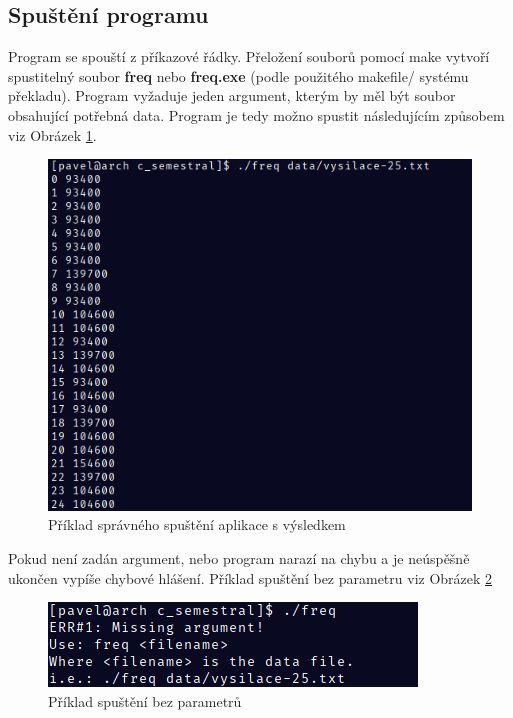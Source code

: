 \documentclass[12pt]{article}
\begin{document}
\subsection{Spuštění programu}
Program se spouští z příkazové řádky. Přeložení souborů pomocí make vytvoří 
spustitelný soubor \textbf{freq} nebo \textbf{freq.exe} (podle použitého
makefile/ systému překladu). Program vyžaduje jeden argument, kterým by měl být
soubor obsahující potřebná data. Program je tedy možno spustit následujícím 
způsobem viz Obrázek \ref{img:success}.
%
\begin{figure}[H]
        \centering
        \includegraphics{img/success.png}
        \caption{Příklad správného spuštění aplikace s výsledkem}
        \label{img:success}
\end{figure}
%
Pokud není zadán argument, nebo program narazí na chybu a je neúspěšně ukončen
vypíše chybové hlášení. Příklad spuštění bez parametru viz Obrázek 
\ref{img:fail}
\begin{figure}[H]
        \centering
        \includegraphics{img/failure.png}
        \caption{Příklad spuštění bez parametrů}
        \label{img:fail}
\end{figure}
%
\end{document}
